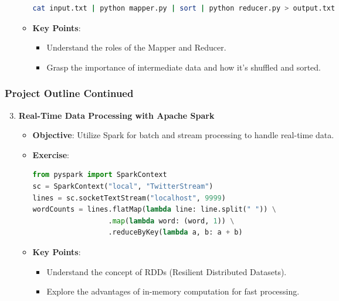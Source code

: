 \documentclass[aspectratio=169]{beamer}
\begin{document}
\begin{frame}[fragile]
\begin{enumerate}
\begin{itemize}
\begin{lstlisting}[language=bash]
cat input.txt | python mapper.py | sort | python reducer.py > output.txt
                    \end{lstlisting}
                \item \textbf{Key Points}:
                    \begin{itemize}
                        \item Understand the roles of the Mapper and Reducer.
                        \item Grasp the importance of intermediate data and how it's shuffled and sorted.
                    \end{itemize}
            \end{itemize}
    \end{enumerate}
\end{frame}

\begin{frame}[fragile]
    \frametitle{Project Outline Continued}
    \begin{enumerate}
        \setcounter{enumi}{2}
        \item \textbf{Real-Time Data Processing with Apache Spark}
            \begin{itemize}
                \item \textbf{Objective}: Utilize Spark for batch and stream processing to handle real-time data.
                \item \textbf{Exercise}:
                    \begin{lstlisting}[language=python]
from pyspark import SparkContext
sc = SparkContext("local", "TwitterStream")
lines = sc.socketTextStream("localhost", 9999)
wordCounts = lines.flatMap(lambda line: line.split(" ")) \
                  .map(lambda word: (word, 1)) \
                  .reduceByKey(lambda a, b: a + b)
                    \end{lstlisting}
                \item \textbf{Key Points}:
                    \begin{itemize}
                        \item Understand the concept of RDDs (Resilient Distributed Datasets).
                        \item Explore the advantages of in-memory computation for fast processing.
                    \end{itemize}
            \end{itemize}
    \end{enumerate}
\end{frame}
\end{document}
